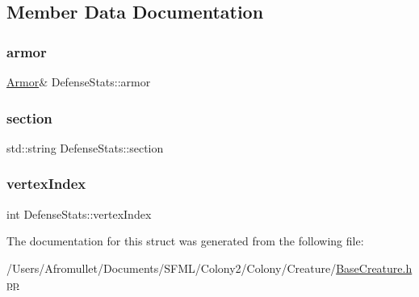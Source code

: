 \subsection{Member Data Documentation}
\mbox{\label{struct_defense_stats_ae352b45ea400b564a0ee8e860b0d8525}} 
\subsubsection{\texorpdfstring{armor}{armor}}
{\footnotesize\ttfamily \mbox{\hyperlink{class_armor}{Armor}}\& Defense\+Stats\+::armor}

\mbox{\label{struct_defense_stats_a32afd7fa0576be676dca6fcf8cc33cf5}} 
\subsubsection{\texorpdfstring{section}{section}}
{\footnotesize\ttfamily std\+::string Defense\+Stats\+::section}

\mbox{\label{struct_defense_stats_a495e186aa26d97e4bf2b80ad44e7a260}} 
\subsubsection{\texorpdfstring{vertex\+Index}{vertexIndex}}
{\footnotesize\ttfamily int Defense\+Stats\+::vertex\+Index}



The documentation for this struct was generated from the following file\+:\begin{DoxyCompactItemize}
\item 
/\+Users/\+Afromullet/\+Documents/\+S\+F\+M\+L/\+Colony2/\+Colony/\+Creature/\mbox{\hyperlink{_base_creature_8hpp}{Base\+Creature.\+hpp}}\end{DoxyCompactItemize}
